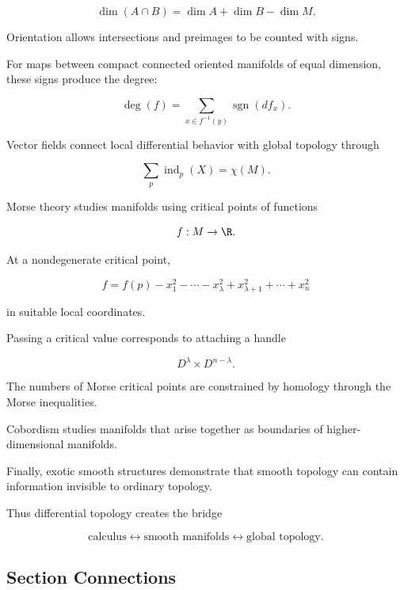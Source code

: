 \[
\boxed{
\dim(A\cap B)
=
\dim A+\dim B-\dim M.
}
\]

Orientation allows intersections and preimages to be counted with signs.

For maps between compact connected oriented manifolds of equal dimension,
these signs produce the degree:

\[
\boxed{
\deg(f)
=
\sum_{x\in f^{-1}(y)}
\operatorname{sgn}(df_x).
}
\]

Vector fields connect local differential behavior with global topology
through

\[
\boxed{
\sum_p\operatorname{ind}_p(X)
=
\chi(M).
}
\]

Morse theory studies manifolds using critical points of functions

\[
f:M\to\R.
\]

At a nondegenerate critical point,

\[
\boxed{
f
=
f(p)
-
x_1^2-\cdots-x_\lambda^2
+
x_{\lambda+1}^2+\cdots+x_n^2
}
\]

in suitable local coordinates.

Passing a critical value corresponds to attaching a handle

\[
\boxed{
D^\lambda\times D^{n-\lambda}.
}
\]

The numbers of Morse critical points are constrained by homology through the
Morse inequalities.

Cobordism studies manifolds that arise together as boundaries of
higher-dimensional manifolds.

Finally, exotic smooth structures demonstrate that smooth topology can
contain information invisible to ordinary topology.

Thus differential topology creates the bridge

\[
\boxed{
\text{calculus}
\longleftrightarrow
\text{smooth manifolds}
\longleftrightarrow
\text{global topology}.
}
\]

\subsection{Section Connections}
\label{subsec:differential-topology-connections}


